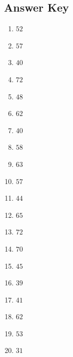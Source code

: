 \documentclass{article}
\begin{document}
\newpage

\subsection*{Answer Key}

\begin{enumerate}
\item $\displaystyle 52 $ \ 
\item $\displaystyle 57 $ \ 
\item $\displaystyle 40 $ \ 
\item $\displaystyle 72 $ \ 
\item $\displaystyle 48 $ \ 
\item $\displaystyle 62 $ \ 
\item $\displaystyle 40 $ \ 
\item $\displaystyle 58 $ \ 
\item $\displaystyle 63 $ \ 
\item $\displaystyle 57 $ \ 
\item $\displaystyle 44 $ \ 
\item $\displaystyle 65 $ \ 
\item $\displaystyle 72 $ \ 
\item $\displaystyle 70 $ \ 
\item $\displaystyle 45 $ \ 
\item $\displaystyle 39 $ \ 
\item $\displaystyle 41 $ \ 
\item $\displaystyle 62 $ \ 
\item $\displaystyle 53 $ \ 
\item $\displaystyle 31 $ \ 

\end{enumerate}
\end{document}
